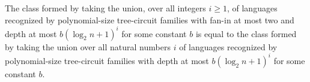 \begin{theorem}
\label{BoolCircuit.TreeNC_eq_TreeAC}
\leanok
{}
The class formed by taking the union, over all integers $i\ge 1$, of languages
recognized by polynomial-size tree-circuit families with fan-in at most two and depth at
most $b(\log_2 n+1)^i$ for some constant $b$ is equal to the class formed by taking the
union over all natural numbers $i$ of languages recognized by polynomial-size
tree-circuit families with depth at most $b(\log_2 n+1)^i$ for some constant $b$.
\end{theorem}
